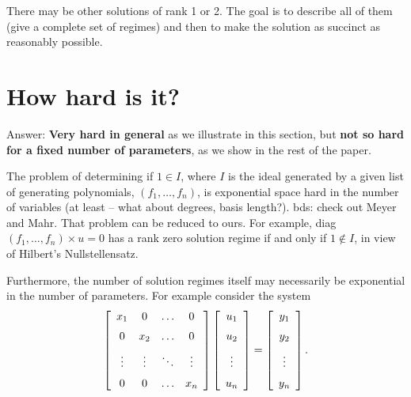 
There may be other solutions of rank 1 or 2.  The goal is to describe all of
them (give a complete set of regimes) and then to make the solution as succinct as reasonably possible.

\newpage
\section{How hard is it?}

Answer:  {\bf Very hard in general} as we illustrate in this section, 
but {\bf not so hard for a fixed number of parameters}, as we show in the 
rest of the paper.

The problem of determining if $1 \in I$, where $I$ is the ideal generated
by a given list of generating polynomials, $(f_1, \ldots, f_n)$, is exponential space hard in 
the number of variables (at least -- what about degrees, basis length?).
\cite{MaMe}
bds: check out {Meyer and Mahr}.
That problem can be reduced to ours.  For example,
diag$(f_1, \ldots, f_n) \times u = 0$ has a rank zero solution regime if and only if 
$1 \notin I$, in view of Hilbert's Nullstellensatz.

Furthermore, the number of solution regimes itself may necessarily be exponential
in the number of parameters.  For example consider the system
\[ 
\left [\begin {array}{cccc} 
    x_1    & 0      & \ldots & 0      \\\noalign{\medskip}
    0      & x_2    & \ldots & 0      \\\noalign{\medskip}
    \vdots & \vdots & \ddots & \vdots \\\noalign{\medskip}
    0      & 0      & \ldots & x_n    
\end {array}\right ] 
\left [\begin {array}{c} 
    u_{1} \\\noalign{\medskip}
    u_{2} \\\noalign{\medskip}
    \vdots  \\\noalign{\medskip}
    u_{n} 
\end {array}\right ]
=
\left [\begin {array}{c} 
    y_{1} \\\noalign{\medskip}
    y_{2} \\\noalign{\medskip}
    \vdots  \\\noalign{\medskip}
    y_{n} 
\end {array}\right ].
\]

